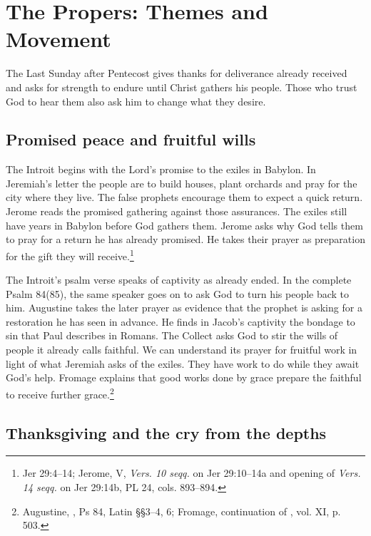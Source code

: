 \section{The Propers: Themes and Movement}

The Last Sunday after Pentecost gives thanks for deliverance already
received and asks for strength to endure until Christ gathers his people.
Those who trust God to hear them also ask him to change what they desire.

\subsection{Promised peace and fruitful wills}

The Introit begins with the Lord's promise to the exiles in Babylon. In
Jeremiah's letter the people are to build houses, plant orchards and pray
for the city where they live. The false prophets encourage them to expect
a quick return. Jerome reads the promised gathering against those
assurances. The exiles still have years in Babylon before God gathers them.
Jerome asks why God tells them to pray for a return he has already
promised. He takes their prayer as preparation for the gift they will
receive.\footnote{Jer 29:4--14;
Jerome,  V, \textit{Vers. 10 seqq.} on Jer 29:10--14a
and opening of \textit{Vers. 14 seqq.} on Jer 29:14b, PL 24,
cols. 893--894.}

The Introit's psalm verse speaks of captivity as already ended. In the
complete Psalm 84(85), the same speaker goes on to ask God to turn his
people back to him. Augustine takes the later prayer as evidence that the
prophet is asking for a restoration he has seen in advance. He finds in
Jacob's captivity the bondage to sin that Paul describes in Romans.
The Collect asks God to stir the wills of people it already calls faithful.
We can understand its prayer for fruitful work in light of what Jeremiah
asks of the exiles. They have work to do while they await God's help.
Fromage explains that good works done by grace prepare the faithful to
receive further grace.\footnote{Augustine,
, Ps 84, Latin §§3--4, 6; Fromage,
continuation of , vol. XI, p. 503.}

\subsection{Thanksgiving and the cry from the depths}

